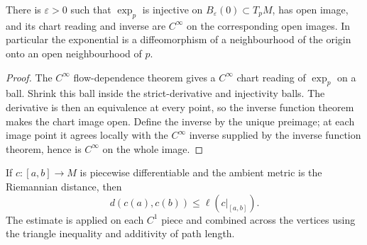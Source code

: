 \begin{lemma}
  \label{lem:dc-ch3-2-9-cinfty}
  \leanok
  There is $\varepsilon>0$ such that $\exp_p$ is injective on
  $B_\varepsilon(0)\subset T_pM$, has open image, and its chart reading and
  inverse are $C^\infty$ on the corresponding open images. In particular the
  exponential is a diffeomorphism of a neighbourhood of the origin onto an
  open neighbourhood of $p$.
\end{lemma}
\begin{proof}
  \leanok
  The $C^\infty$ flow-dependence theorem gives a $C^\infty$ chart reading of
  $\exp_p$ on a ball. Shrink this ball inside the strict-derivative and
  injectivity balls. The derivative is then an equivalence at every point, so
  the inverse function theorem makes the chart image open. Define the inverse
  by the unique preimage; at each image point it agrees locally with the
  $C^\infty$ inverse supplied by the inverse function theorem, hence is
  $C^\infty$ on the whole image.
\end{proof}

\begin{lemma}
  \label{lem:dc-ch3-3-1-edist}
  \leanok
  If $c:[a,b]\to M$ is piecewise differentiable and the ambient metric is the
  Riemannian distance, then
  $$
    d(c(a),c(b))\leq \ell(c|_{[a,b]}).
  $$
  The estimate is applied on each $C^1$ piece and combined across the vertices
  using the triangle inequality and additivity of path length.
\end{lemma}
